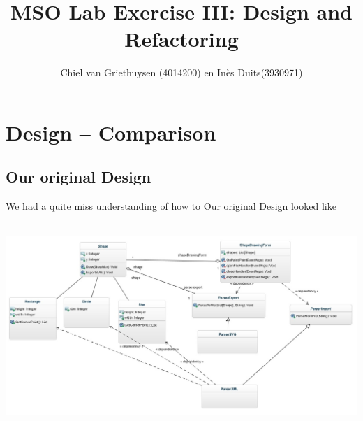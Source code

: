 \documentclass[a4paper,12pt]{article}
\begin{document}
\begin{titlepage}

\title{MSO Lab Exercise III: Design and Refactoring}
\author{Chiel van Griethuysen (4014200) en In\`es Duits(3930971)}
\maketitle

\end{titlepage}

\newpage

\tableofcontents

\newpage

\section{Design – Comparison}

\subsection{Our original Design}
We had a quite miss understanding of how to 
Our original Design looked like

\\
\includegraphics[scale=0.5]{diagram.jpg}
\\
\end{document}
